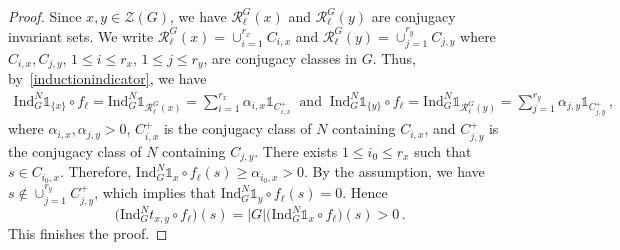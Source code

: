 \documentclass[12pt]{amsart}
\numberwithin{equation}{section}
\theoremstyle{definition}
\theoremstyle{remark}
\begin{document}
 \begin{proof}
     Since $x,y\in \mathcal{Z}(G)$, we have $\mathcal{R}_\ell^G(x)$ and $\mathcal{R}_\ell^G(y)$ are conjugacy invariant sets. We write $\mathcal{R}_\ell^G(x)=\cup_{i=1}^{r_x} C_{i,x}$ and $\mathcal{R}_\ell^G(y)=\cup_{j=1}^{r_y} C_{j,y} $  where $C_{i,x},C_{j,y}$, $1\le i\le r_x$, $1\le j\le r_y$, are conjugacy classes in $G$. Thus, by~\eqref{inductionindicator}, we have
     \begin{align*}
         \mathrm{Ind}_G^N \mathds{1}_{\{x\}}\circ f_\ell=\mathrm{Ind}_G^N \mathds{1}_{\mathcal{R}_\ell^G(x)}=\sum_{i=1}^{r_x} \alpha_{i,x}\mathds{1}_{C_{i,x}^+}\ \text{ and }\ 
        \mathrm{Ind}_G^N \mathds{1}_{\{y\}}\circ f_\ell=\mathrm{Ind}_G^N \mathds{1}_{\mathcal{R}_\ell^G(y)}=\sum_{j=1}^{r_y} \alpha_{j,y}\mathds{1}_{C_{j,y}^+}\, ,
     \end{align*}
     where $\alpha_{i,x},\alpha_{j,y}>0$, $C_{i,x}^+$ is the conjugacy class of $N$ containing $C_{i,x}$, and $C_{j,y}^+$ is the conjugacy class of $N$ containing $C_{j,y}$. There exists $1\le i_0\le r_x$ such that $s\in C_{i_0,x}$. Therefore, $\mathrm{Ind}_G^N \mathds{1}_{x}\circ f_\ell (s)\ge \alpha_{i_0,x}>0$. By the assumption, we have $s\notin \cup_{j=1}^{r_y}C_{j,y}^+$, which implies that $\mathrm{Ind}_G^N \mathds{1}_{y}\circ f_\ell (s)=0$. Hence \[\bigl(\mathrm{Ind}_G^N t_{x,y} \circ f_\ell\bigr) (s)=|G|\bigl(\mathrm{Ind}_G^N \mathds{1}_{x}\circ f_\ell\bigr) (s)>0\, .\]
     This finishes the proof.
 \end{proof}
 
\end{document}
